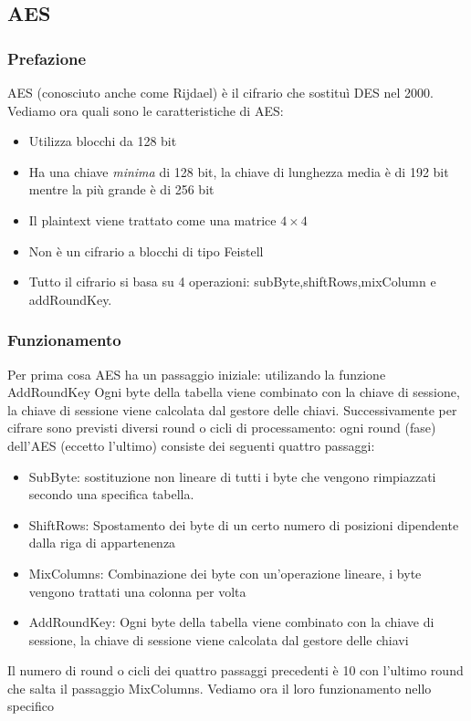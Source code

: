 \documentclass[10pt,a4paper]{article}
\begin{document}
\subsection{AES}
\subsubsection{Prefazione}
AES (conosciuto anche come Rijdael) è il cifrario che sostituì DES nel 2000. Vediamo ora quali sono le caratteristiche di AES:
\begin{itemize}
\item Utilizza blocchi da 128 bit
\item Ha una chiave \textit{minima} di 128 bit, la chiave di lunghezza media è di 192 bit mentre la più grande è di 256 bit
\item Il plaintext viene trattato come una matrice $4 \times 4$ 
\item Non è un cifrario a blocchi di tipo Feistell
\item Tutto il cifrario si basa su 4 operazioni: subByte,shiftRows,mixColumn e addRoundKey.
\end{itemize}
\subsubsection{Funzionamento}
Per prima cosa AES ha un passaggio iniziale: utilizando la funzione AddRoundKey Ogni byte della tabella viene combinato con la chiave di sessione, la chiave di sessione viene calcolata dal gestore delle chiavi. Successivamente per cifrare sono previsti diversi round o cicli di processamento: ogni round (fase) dell'AES (eccetto l'ultimo) consiste dei seguenti quattro passaggi:
\begin{itemize}
\item SubByte: sostituzione non lineare di tutti i byte che vengono rimpiazzati secondo una specifica tabella.
\item ShiftRows: Spostamento dei byte di un certo numero di posizioni dipendente dalla riga di appartenenza
\item MixColumns: Combinazione dei byte con un'operazione lineare, i byte vengono trattati una colonna per volta
\item AddRoundKey: Ogni byte della tabella viene combinato con la chiave di sessione, la chiave di sessione viene calcolata dal gestore delle chiavi
\end{itemize}
Il numero di round o cicli dei quattro passaggi precedenti è 10 con l'ultimo round che salta il passaggio MixColumns. Vediamo ora il loro funzionamento nello specifico
\newpage
\end{document}
